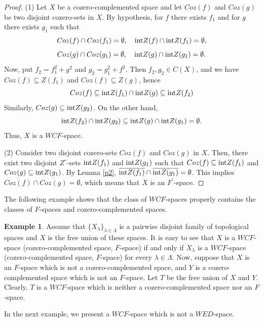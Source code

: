 \documentclass{amsart}
\theoremstyle{definition}
\theoremstyle{remark}
\numberwithin{equation}{section}
\newcommand{\rint}{{\rm int}}
\newcommand{\la}{\lambda}
\newcommand{\La}{\Lambda}
\newcommand{\ov}{\overline}
\theoremstyle{definition}\newtheorem{thm}{Theorem}[section]
\theoremstyle{definition}\newtheorem{cor}[thm]{Corollary}
\theoremstyle{definition}\newtheorem{lem}[thm]{Lemma}
\theoremstyle{definition}\newtheorem{prop}[thm]{Proposition}
\theoremstyle{definition}\newtheorem{defn}[thm]{Definition}
\theoremstyle{definition}\newtheorem{Rem}[thm]{Remark}
\theoremstyle{remark}\newtheorem{rem}[thm]{Remark}
\theoremstyle{definition}\newtheorem{exam}[thm]{Example}
\theoremstyle{definition}\newtheorem{qu}[thm]{question}
\begin{document}
\begin{proof}
(1) Let $X$ be a cozero-complemented space and let $Coz(f)$ and $Coz(g)$ be two disjoint cozero-sets in $X$.  
By hypothesis, for $f$ there exists $f_1$ and for $g$ there exists $g_1$ such that 
\[
Coz(f)\cap Coz(f_1)=\emptyset,\quad \rint Z(f)\cap \rint Z(f_1)=\emptyset,
\]
\[
Coz(g)\cap Coz(g_1)=\emptyset,\quad \rint Z(g)\cap \rint Z(g_1)=\emptyset.
\]
Now, put $f_2=f_1^2+g^2$ and $g_2=g_1^2+f^2$. Then $f_2,g_2\in C(X)$, and we have  
$Coz(f)\subseteq Z(f_1)$ and $Coz(f)\subseteq Z(g)$, hence
\[
Coz(f)\subseteq \rint Z(f_1)\cap \rint Z(g)\subseteq \rint Z(f_2)
\]
Similarly, $Coz(g)\subseteq \rint Z(g_2)$.  On the other hand,
\[
\rint Z(f_2)\cap \rint Z(g_2)
\subseteq \rint Z(g)\cap \rint Z(g_1)
=\emptyset.
\]
Thus, $X$ is a $WCF$-space.

(2) Consider two disjoint cozero-sets $Coz(f)$ and $Coz(g)$ in $X$. Then, there exist two disjoint $Z^{\circ}$-sets $\rint Z(f_1)$ and $\rint Z(g_1)$ such that $Coz(f)\subseteq \rint Z(f_1)$ and $Coz(g)\subseteq\rint Z(g_1)$. By  Lemma  \ref{p2}, $\ov{\rint Z(f_1)}\cap \ov{\rint Z(g_1)}=\emptyset$. This implies $\ov{ Coz(f)}\cap\ov{ Coz(g)}=\emptyset$, which means that $X$ is an $F^{\prime}$-space.
\end{proof}

The following example shows that the class of $WCF$-spaces properly contains the classes of $F$-spaces and cozero-complemented spaces.

\begin{exam}
Assume that $\{X_\la\}_{\la\in\La}$ is a pairwise disjoint family of topological spaces and $X$ is the free union of these spaces. It is easy to see that $X$ is a $WCF$-space (cozero-complemented space, $F$-space) if and only if $X_\la$ is a $WCF$-space (cozero-complemented space, $F$-space) for every $\la\in\La$. Now, suppose that $X$ is an $F$-space which is not a cozero-complemented space, and $Y$ is a cozero-complemented space which is not an $F$-space. Let $T$ be the free union of $X$ and $Y$. Clearly, $T$ is a $WCF$-space which is neither a cozero-complemented space nor an $F$-space.
\end{exam}

In the next example, we present a $WCF$-space which is not a $WED$-space.
\end{document}
